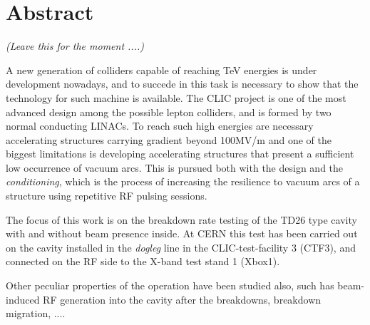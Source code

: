 \chapter*{Abstract}

\begin{center}
\textit{(Leave this for the moment ....)}
\vspace{4cm}
\end{center}



A new generation of colliders capable of reaching TeV energies is under development nowadays, and to succede in this task is necessary to show that the technology for such machine is available. The CLIC project is one of the most advanced design among the possible lepton colliders, and is formed by two normal conducting LINACs. To reach such high energies are necessary accelerating structures carrying gradient beyond 100MV/m and one of the biggest limitations is developing accelerating structures that present a sufficient low occurrence of vacuum arcs. This is pursued both with the design and the \textit{conditioning}, which is the process of increasing the resilience to vacuum arcs of a structure using repetitive RF pulsing sessions. 

The focus of this work is on the breakdown rate testing of the TD26 type cavity with and without beam presence inside. At CERN this test has been carried out on the cavity installed in the \textit{dogleg} line in the CLIC-test-facility 3 (CTF3), and connected on the RF side to the X-band test stand 1 (Xbox1).

Other peculiar properties of the operation have been studied also, such has beam-induced RF generation into the cavity after the breakdowns, breakdown migration, ....